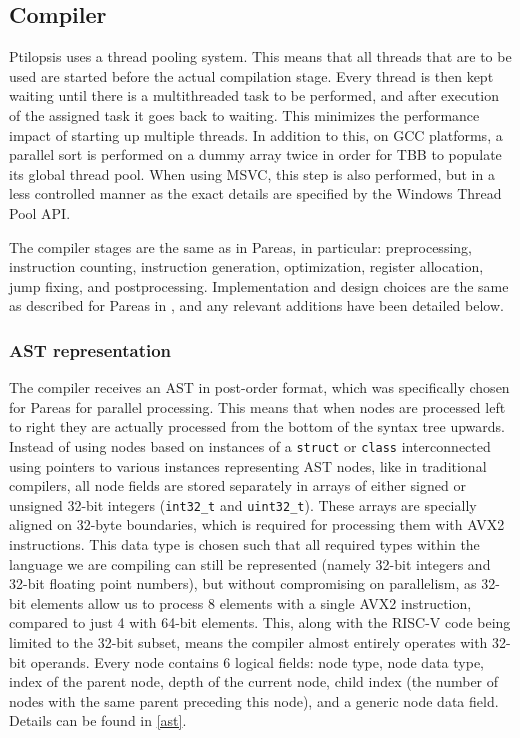 \documentclass[11pt,dvipsnames]{article}
\newcommand{\icpp}[1]{\texttt{#1}}
\begin{document}
\subsection{Compiler}
Ptilopsis uses a thread pooling system. This means that all threads that are to be used are started before the actual compilation stage. Every thread is then kept waiting until there is a multithreaded task to be performed, and after execution of the assigned task it goes back to waiting. This minimizes the performance impact of starting up multiple threads. In addition to this, on GCC platforms, a parallel sort is performed on a dummy array twice in order for TBB to populate its global thread pool. When using MSVC, this step is also performed, but in a less controlled manner as the exact details are specified by the Windows Thread Pool API.

The compiler stages are the same as in Pareas, in particular: preprocessing, instruction counting, instruction generation, optimization, register allocation, jump fixing, and postprocessing. Implementation and design choices are the same as described for Pareas in \cite{huijben2021}, and any relevant additions have been detailed below. 

\subsubsection*{AST representation}
The compiler receives an AST in post-order format, which was specifically chosen for Pareas for parallel processing. This means that when nodes are processed left to right they are actually processed from the bottom of the syntax tree upwards. Instead of using nodes based on instances of a \icpp{struct} or \icpp{class} interconnected using pointers to various instances representing AST nodes, like in traditional compilers, all node fields are stored separately in arrays of either signed or unsigned 32-bit integers (\icpp{int32_t} and \icpp{uint32_t}). These arrays are specially aligned on 32-byte boundaries, which is required for processing them with AVX2 instructions. This data type is chosen such that all required types within the language we are compiling can still be represented (namely 32-bit integers and 32-bit floating point numbers), but without compromising on parallelism, as 32-bit elements allow us to process 8 elements with a single AVX2 instruction, compared to just 4 with 64-bit elements. This, along with the RISC-V code being limited to the 32-bit subset, means the compiler almost entirely operates with 32-bit operands. Every node contains 6 logical fields: node type, node data type, index of the parent node, depth of the current node, child index (the number of nodes with the same parent preceding this node), and a generic node data field. Details can be found in \autoref{ast}.
\end{document}
